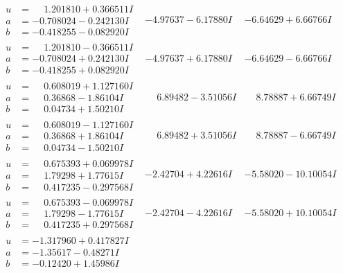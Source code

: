\documentclass[1p]{elsarticle_modified}
\theoremstyle{definition}
\begin{document}
$$\begin{array}{c|c|c}
\begin{aligned}
u &= \phantom{-}1.201810 + 0.366511 I \\
a &= -0.708024 - 0.242130 I \\
b &= -0.418255 - 0.082920 I\end{aligned}
 & -4.97637 - 6.17880 I & -6.64629 + 6.66766 I \\ \hline\begin{aligned}
u &= \phantom{-}1.201810 - 0.366511 I \\
a &= -0.708024 + 0.242130 I \\
b &= -0.418255 + 0.082920 I\end{aligned}
 & -4.97637 + 6.17880 I & -6.64629 - 6.66766 I \\ \hline\begin{aligned}
u &= \phantom{-}0.608019 + 1.127160 I \\
a &= \phantom{-}0.36868 - 1.86104 I \\
b &= \phantom{-}0.04734 + 1.50210 I\end{aligned}
 & \phantom{-}6.89482 - 3.51056 I & \phantom{-}8.78887 + 6.66749 I \\ \hline\begin{aligned}
u &= \phantom{-}0.608019 - 1.127160 I \\
a &= \phantom{-}0.36868 + 1.86104 I \\
b &= \phantom{-}0.04734 - 1.50210 I\end{aligned}
 & \phantom{-}6.89482 + 3.51056 I & \phantom{-}8.78887 - 6.66749 I \\ \hline\begin{aligned}
u &= \phantom{-}0.675393 + 0.069978 I \\
a &= \phantom{-}1.79298 + 1.77615 I \\
b &= \phantom{-}0.417235 - 0.297568 I\end{aligned}
 & -2.42704 + 4.22616 I & -5.58020 - 10.10054 I \\ \hline\begin{aligned}
u &= \phantom{-}0.675393 - 0.069978 I \\
a &= \phantom{-}1.79298 - 1.77615 I \\
b &= \phantom{-}0.417235 + 0.297568 I\end{aligned}
 & -2.42704 - 4.22616 I & -5.58020 + 10.10054 I \\ \hline\begin{aligned}
u &= -1.317960 + 0.417827 I \\
a &= -1.35617 - 0.48271 I \\
b &= -0.12420 + 1.45986 I\end{aligned}

\end{array}$$
\end{document}
